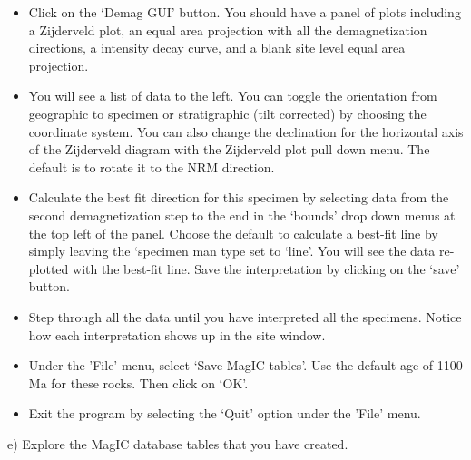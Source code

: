 {\begin{itemize}
\item Click on the 	`Demag GUI' button.  You should have a panel of plots including a  Zijderveld plot, an equal area projection with all the demagnetization directions, a intensity decay curve, and a blank site level equal area projection.    
\item You will see a list of data to the left.   You can toggle the orientation from geographic to specimen or stratigraphic (tilt corrected) by choosing the coordinate system.   You can also change the declination for the horizontal axis of the Zijderveld diagram with the Zijderveld plot pull down menu.  The default is to rotate it to the NRM direction.    
\item  Calculate the best fit direction for this specimen by selecting data from the second demagnetization step to the end in the `bounds' drop down menus at the top left of the panel.   Choose the default to calculate a best-fit line by simply leaving the `specimen man type set to `line'.    You will see the data re-plotted with the best-fit line.   Save the interpretation by clicking on the `save' button.  
\item Step through all the data until you have interpreted all the specimens.   Notice how each interpretation shows up in the site window.  
\item  Under the 'File' menu, select `Save MagIC tables'.  Use the default age of 1100 Ma for these rocks.  Then click on `OK'. 
\item Exit the program by  selecting the `Quit' option under the 'File' menu.  
\end{itemize}


e) Explore the MagIC database tables that you have created. 

}
